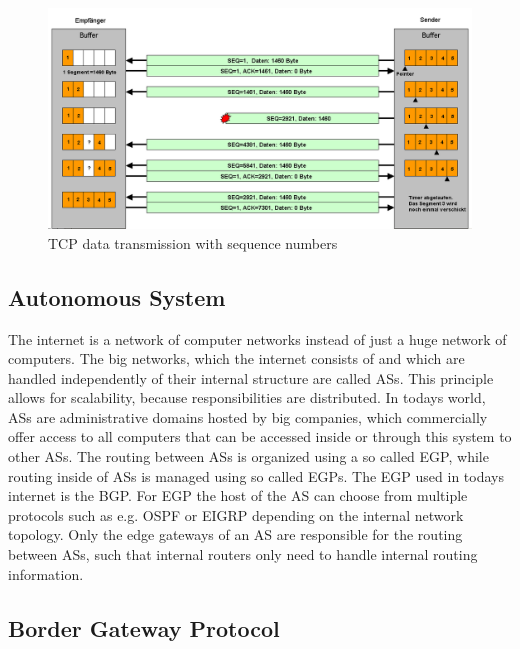 \begin{figure}[h]
      \centering
      \includegraphics[width=\textwidth]{gfx/Tcp_transfer.png}
      \caption{TCP data transmission with sequence numbers}
      \label{fig:tcp_data_transmission}
\end{figure}

\subsection{Autonomous System}

The internet is a network of computer networks instead of just a huge network of computers. The big networks, which the internet consists of and which are handled independently of their internal structure are called \acp{AS}. This principle allows for scalability, because responsibilities are distributed. In todays world, \acp{AS} are administrative domains hosted by big companies, which commercially offer access to all computers that can be accessed inside or through this system to other \acp{AS}. The routing between \acp{AS} is organized using a so called \ac{EGP}, while routing inside of \acp{AS} is managed using so called \ac{EGP}s. The \ac{EGP} used in todays internet is the \ac{BGP}. For \ac{EGP} the host of the \ac{AS} can choose from multiple protocols such as e.g. \ac{OSPF} or \ac{EIGRP} depending on the internal network topology. Only the edge gateways of an \ac{AS} are responsible for the routing between \acp{AS}, such that internal routers only need to handle internal routing information.

\subsection{Border Gateway Protocol}

